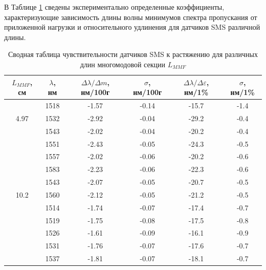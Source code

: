В Таблице \ref{tab:sms_sensitivity_summary} сведены экспериментально определенные коэффициенты, характеризующие зависимость длины волны минимумов спектра пропускания от приложенной нагрузки и относительного удлинения для датчиков SMS различной длины.


\begin{longtable}[c]{|c|
    >{\columncolor[HTML]{FFFFFF}}c |c|c|c|c|}
    \caption{Сводная таблица чувствительности датчиков SMS к растяжению для различных длин многомодовой секции $L_{MMF}$}
    \label{tab:sms_sensitivity_summary}\\
    \hline
    \cellcolor[HTML]{32CB00}$L_{MMF}$,   см &
      \cellcolor[HTML]{32CB00}$\lambda$, нм &
      \cellcolor[HTML]{32CB00}$\Delta\lambda/\Delta   m$, нм/100г &
      \cellcolor[HTML]{32CB00}$\sigma$,   нм/100г &
      \cellcolor[HTML]{32CB00}$\Delta\lambda/\Delta\varepsilon$,   нм/1\% &
      \cellcolor[HTML]{32CB00}$\sigma$, нм/1\% \\ \hline
    \endfirsthead
    \endhead
                            & 1518 & -1.57 & -0.14 & -15.7 & -1.4 \\ \cline{2-6} 
    \multirow{-2}{*}{4.97}  & 1532 & -2.92 & -0.04 & -29.2 & -0.4 \\ \hline
                            & 1543 & -2.02 & -0.04 & -20.2 & -0.4 \\ \cline{2-6} 
                            & 1551 & -2.43 & -0.05 & -24.3 & -0.5 \\ \cline{2-6} 
                            & 1557 & -2.02 & -0.06 & -20.2 & -0.6 \\ \cline{2-6} 
                            & 1583 & -2.23 & -0.06 & -22.3 & -0.6 \\ \cline{2-6} 
                            & 1543 & -2.07 & -0.05 & -20.7 & -0.5 \\ \cline{2-6} 
    \multirow{-6}{*}{10.2}  & 1560 & -2.12 & -0.05 & -21.2 & -0.5 \\ \hline
                            & 1514 & -1.74 & -0.07 & -17.4 & -0.7 \\ \cline{2-6} 
                            & 1519 & -1.75 & -0.08 & -17.5 & -0.8 \\ \cline{2-6} 
                            & 1526 & -1.61 & -0.09 & -16.1 & -0.9 \\ \cline{2-6} 
                            & 1531 & -1.76 & -0.07 & -17.6 & -0.7 \\ \cline{2-6} 
                            & 1537 & -1.81 & -0.07 & -18.1 & -0.7 \\ \cline{2-6} 

\end{longtable}
